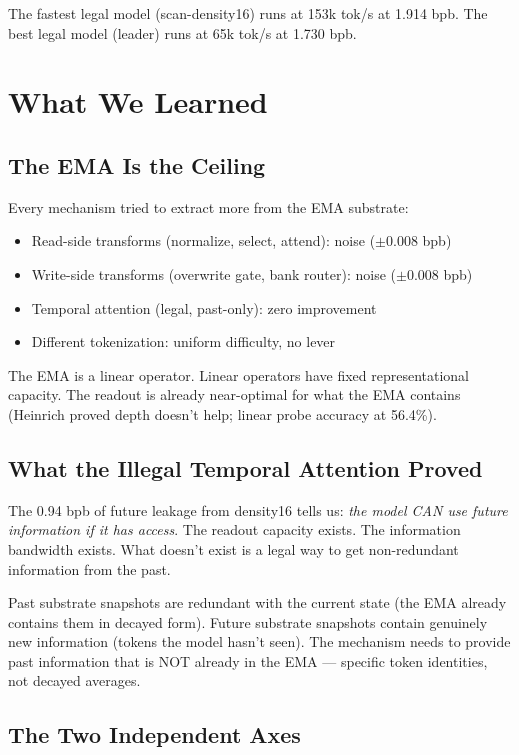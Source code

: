 \documentclass[11pt,a4paper]{report}
\begin{document}
The fastest legal model (scan-density16) runs at 153k tok/s at 1.914 bpb. The best legal model (leader) runs at 65k tok/s at 1.730 bpb.


\chapter{What We Learned}

\section{The EMA Is the Ceiling}

Every mechanism tried to extract more from the EMA substrate:
\begin{itemize}[nosep]
\item Read-side transforms (normalize, select, attend): noise ($\pm 0.008$ bpb)
\item Write-side transforms (overwrite gate, bank router): noise ($\pm 0.008$ bpb)
\item Temporal attention (legal, past-only): zero improvement
\item Different tokenization: uniform difficulty, no lever
\end{itemize}

The EMA is a linear operator. Linear operators have fixed representational capacity. The readout is already near-optimal for what the EMA contains (Heinrich proved depth doesn't help; linear probe accuracy at 56.4\%).

\section{What the Illegal Temporal Attention Proved}

The 0.94 bpb of future leakage from density16 tells us: \emph{the model CAN use future information if it has access}. The readout capacity exists. The information bandwidth exists. What doesn't exist is a legal way to get non-redundant information from the past.

Past substrate snapshots are redundant with the current state (the EMA already contains them in decayed form). Future substrate snapshots contain genuinely new information (tokens the model hasn't seen). The mechanism needs to provide past information that is NOT already in the EMA --- specific token identities, not decayed averages.

\section{The Two Independent Axes}
\end{document}
